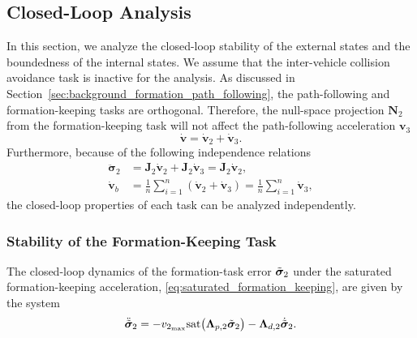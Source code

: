 \subsection{Closed-Loop Analysis}\label{sec:closed_loop}
In this section, we analyze the closed-loop stability of the external states and the boundedness of the internal states. We assume that the inter-vehicle collision avoidance task is inactive for the analysis. As discussed in Section~\ref{sec:background_formation_path_following}, the path-following and formation-keeping tasks are orthogonal. Therefore, the null-space projection $\mathbf{N}_2$ from the formation-keeping task will not affect the path-following acceleration $\mathbf{v}_3$
\begin{equation}\label{eq:commanded_acceleration_inactive_colav}
    \dot{\mathbf{v}} = \dot{\mathbf{v}}_2 + \dot{\mathbf{v}}_3.
\end{equation}
Furthermore, because of the following independence relations
\begin{align}
    \ddot{\bm{\sigma}}_2 &= \mathbf{J}_2\dot{\mathbf{v}}_2 + \mathbf{J}_2\dot{\mathbf{v}}_3 = \mathbf{J}_2\dot{\mathbf{v}}_2,\\
    \dot{\mathbf{v}}_b &= \frac{1}{n}\sum_{i=1}^n (\dot{\mathbf{v}}_2 + \dot{\mathbf{v}}_3) = \frac{1}{n}\sum_{i=1}^n \dot{\mathbf{v}}_3,
\end{align}
the closed-loop properties of each task can be analyzed independently.


\subsubsection{Stability of the Formation-Keeping Task}
The closed-loop dynamics of the formation-task error $\Tilde{\bm{\sigma}}_2$ under the saturated formation-keeping acceleration, \eqref{eq:saturated_formation_keeping}, are given by the system
\begin{equation}\label{eq:task_2_dynamics}
    \ddot{\Tilde{\bm{\sigma}}}_2 = - v_{2_{\max}}\mathrm{sat}\bigl(\mathbf{\Lambda}_{p,2}\Tilde{\bm{\sigma}}_2\bigr) - \mathbf{\Lambda}_{d,2} \dot{\Tilde{\bm{\sigma}}}_2.
\end{equation}

